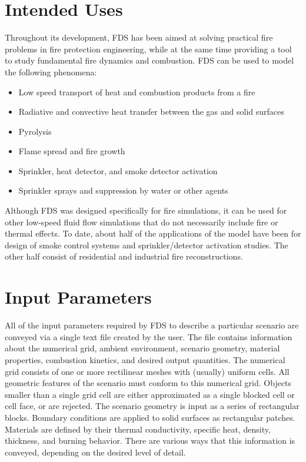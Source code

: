 \documentclass[11pt]{book}
\begin{document}
\section{Intended Uses}

Throughout its development, FDS has been aimed at solving practical fire problems in fire protection engineering, while at the same time providing a
tool to study fundamental fire dynamics and combustion. FDS can be used to model the following phenomena:
\begin{itemize}
\setlength{\itemsep}{0.0in}
\item Low speed transport of heat and combustion products from a fire
\item Radiative and convective heat transfer between the gas and solid surfaces
\item Pyrolysis
\item Flame spread and fire growth
\item Sprinkler, heat detector, and smoke detector activation
\item Sprinkler sprays and suppression by water or other agents
\end{itemize}
Although FDS was designed specifically for fire simulations, it can be used for other low-speed fluid flow simulations that do not necessarily
include fire or thermal effects. To date, about half of the applications of the model have been for design of smoke control systems and
sprinkler/detector activation studies. The other half consist of residential and industrial fire reconstructions.


\section{Input Parameters}

All of the input parameters required by FDS to describe a particular scenario are conveyed via a single text file created by the user. The file
contains information about the numerical grid, ambient environment, scenario geometry, material properties, combustion kinetics, and desired output
quantities. The numerical grid consists of one or more rectilinear meshes with (usually) uniform cells. All geometric features of the scenario must
conform to this numerical grid. Objects smaller than a single grid cell are either approximated as a single blocked cell or cell face, or are rejected. The scenario geometry
is input as a series of rectangular blocks. Boundary conditions are applied to solid surfaces as rectangular patches. Materials are defined by their
thermal conductivity, specific heat, density, thickness, and burning behavior. There are various ways that this information is conveyed, depending on
the desired level of detail.
\end{document}
